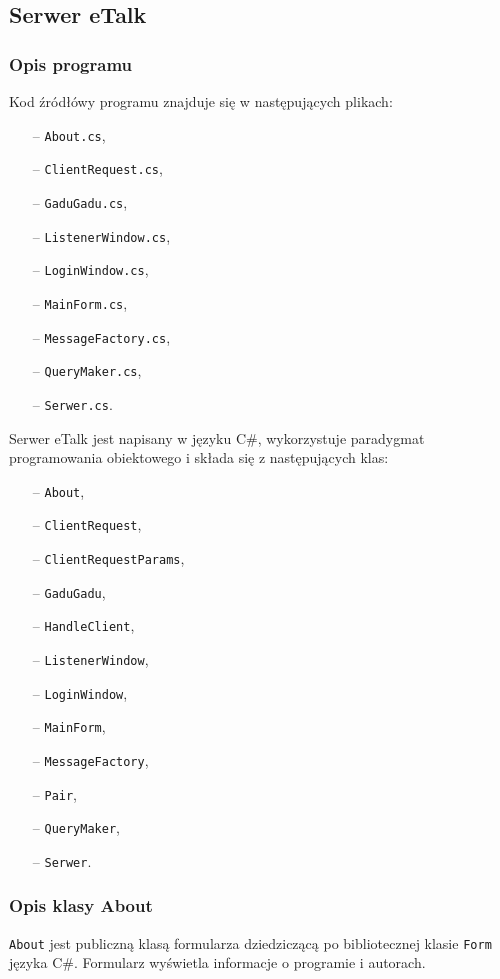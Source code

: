 \documentclass[a4paper,12pt]{article}
\begin{document}
\subsection[Serwer eTalk]{Serwer eTalk}
\subsubsection[Opis programu]{Opis programu}
Kod źródłówy programu znajduje się w następujących plikach:
\begin{itemize}
    \item[--] \texttt{About.cs},
    \item[--] \texttt{ClientRequest.cs},
    \item[--] \texttt{GaduGadu.cs},
    \item[--] \texttt{ListenerWindow.cs},
    \item[--] \texttt{LoginWindow.cs},
    \item[--] \texttt{MainForm.cs},
    \item[--] \texttt{MessageFactory.cs},
    \item[--] \texttt{QueryMaker.cs},
    \item[--] \texttt{Serwer.cs}.
\end{itemize}
Serwer eTalk jest napisany w języku C\#, wykorzystuje paradygmat programowania obiektowego i składa
się z następujących klas:
\begin{itemize}
    \item[--] \texttt{About},
    \item[--] \texttt{ClientRequest},
    \item[--] \texttt{ClientRequestParams},
    \item[--] \texttt{GaduGadu},
    \item[--] \texttt{HandleClient},
    \item[--] \texttt{ListenerWindow},
    \item[--] \texttt{LoginWindow},
    \item[--] \texttt{MainForm},
    \item[--] \texttt{MessageFactory},
    \item[--] \texttt{Pair},
    \item[--] \texttt{QueryMaker},
    \item[--] \texttt{Serwer}.
\end{itemize}

\subsubsection[Opis klasy About]{Opis klasy About}
\texttt{About} jest publiczną klasą formularza dziedziczącą po bibliotecznej klasie \texttt{Form}
języka C\#. Formularz wyświetla informacje o programie i autorach.
\end{document}
